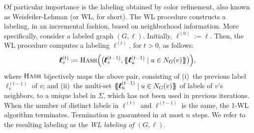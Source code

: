 Of particular importance is the labeling obtained by color refinement, also known as Weisfeiler-Lehman (or WL, for short). The WL procedure constructs a labeling, in an incremental fashion, based on neighborhood information. More specifically, consider a labeled graph $(G,\pmb{\ell})$. Initially, 
$\pmb{\ell}^{(0)}:=\pmb{\ell}$. Then, the WL procedure computes a labeling $\pmb{\ell}^{(t)}$, for $t> 0$, as follows: 
$$
\pmb{\ell}^{(t)}_v:=\textsc{Hash}\Bigl(\bigl(\pmb{\ell}^{(t-1)}_v,\{\!\!\{ \pmb{\ell}_u^{(t-1)} \mathrel{\mid} u \in N_G(v) \}\!\!\}\bigr)\Bigr),
$$
where $\textsc{Hash}$ bijectively maps the above pair, consisting of (i)~the previous label 
$\pmb{\ell}^{(t-1)}_v$ of $v$; and (ii)~the multi-set $\{\!\!\{ \pmb{\ell}_u^{(t-1)} \mathrel{\mid} u \in N_G(v) \}\!\!\}$ of labels of $v$'s neighbors, to a unique label in $\Sigma$, which has not been used in previous iterations. When the number of distinct labels in $\pmb{\ell}^{(t)}$ and $\pmb{\ell}^{(t-1)}$ is the same, the 1-WL algorithm terminates.
Termination is guaranteed in at most $n$ steps. We refer to the resulting labeling as the \textit{WL labeling of $(G,\pmb{\ell})$}. 